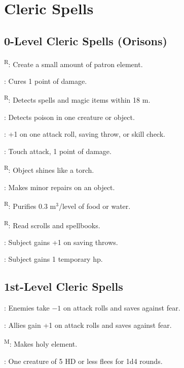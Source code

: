 \section{Cleric Spells}



\subsection{0-Level Cleric Spells (Orisons)}

\textsuperscript{R}: Create a small amount of patron element.

: Cures 1 point of damage.

\textsuperscript{R}: Detects spells and magic items within 18 m.

: Detects poison in one creature or object.

: +1 on one attack roll, saving throw, or skill check.

: Touch attack, 1 point of damage.

\textsuperscript{R}: Object shines like a torch.

: Makes minor repairs on an object.

\textsuperscript{R}: Purifies 0.3 m$^3$/level of food or water.

\textsuperscript{R}: Read scrolls and spellbooks.

: Subject gains +1 on saving throws.

: Subject gains 1 temporary hp.



\subsection{1st-Level Cleric Spells}

: Enemies take $-1$ on attack rolls and saves against fear.

: Allies gain +1 on attack rolls and saves against fear.

\textsuperscript{M}: Makes holy element. %

: One creature of 5 HD or less flees for 1d4 rounds.

